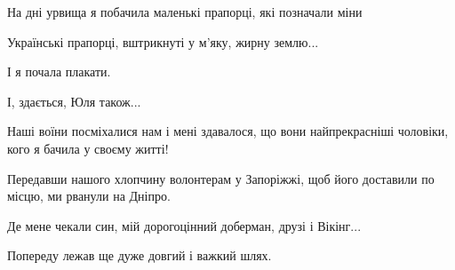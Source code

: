На дні урвища я побачила маленькі прапорці, які позначали міни

Українські прапорці, вштрикнуті у м'яку, жирну землю...

І я почала плакати.

І, здається,  Юля також...

Наші воїни посміхалися нам і мені здавалося, що вони найпрекрасніші чоловіки,
кого я бачила у своєму житті!

Передавши нашого хлопчину волонтерам у Запоріжжі,  щоб його доставили по місцю,
ми рванули на Дніпро.

Де мене чекали син,  мій дорогоцінний доберман, друзі і Вікінг...

Попереду лежав ще дуже довгий і важкий шлях.

